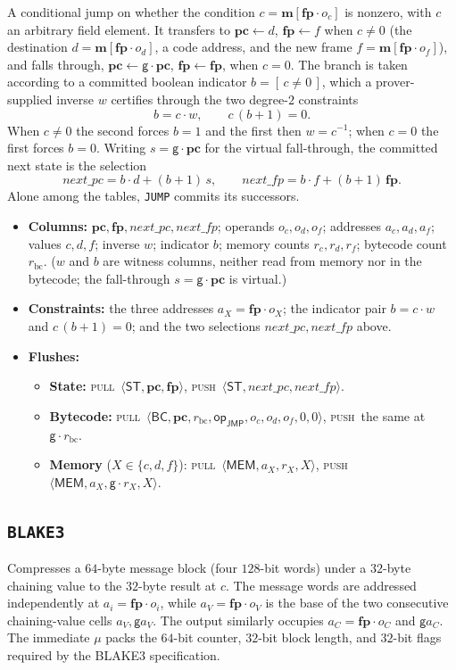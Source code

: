 \documentclass[11pt]{article}
\newcommand{\gen}{\mathsf{g}}
\newcommand{\loc}[1]{\mem[\fp\cdot #1]}
\newcommand{\pc}{\mathbf{pc}}
\newcommand{\fp}{\mathbf{fp}}
\newcommand{\mem}{\mathbf{m}}
\newcommand{\push}{\textsc{push}}
\newcommand{\pull}{\textsc{pull}}
\newcommand{\tup}[1]{\langle #1 \rangle}
\newcommand{\dsep}[1]{\mathsf{#1}}
\newcommand{\opc}[1]{\mathsf{op}_{\mathsf{#1}}}
\begin{document}
A conditional jump on whether the condition $c=\loc{o_c}$ is nonzero, with $c$ an arbitrary field element. It transfers to $\pc\gets d$, $\fp\gets f$ when $c\neq0$ (the destination $d=\loc{o_d}$, a code address, and the new frame $f=\loc{o_f}$), and falls through, $\pc\gets\gen\cdot\pc$, $\fp\gets\fp$, when $c=0$. The branch is taken according to a committed boolean indicator $b=[\,c\neq0\,]$, which a prover-supplied inverse $w$ certifies through the two degree-$2$ constraints
\[
  b=c\cdot w,\qquad c\,(b+1)=0 .
\]
When $c\neq0$ the second forces $b=1$ and the first then $w=c^{-1}$; when $c=0$ the first forces $b=0$. Writing $s=\gen\cdot\pc$ for the virtual fall-through, the committed next state is the selection
\[
  \mathit{next\_pc}=b\cdot d+(b+1)\,s,\qquad \mathit{next\_fp}=b\cdot f+(b+1)\,\fp.
\]
Alone among the tables, \texttt{JUMP} commits its successors.
\begin{itemize}
\item \textbf{Columns:} $\pc,\fp,\mathit{next\_pc},\mathit{next\_fp}$; operands $o_c,o_d,o_f$; addresses $a_c,a_d,a_f$; values $c,d,f$; inverse $w$; indicator $b$; memory counts $r_c,r_d,r_f$; bytecode count $r_{\mathrm{bc}}$. ($w$ and $b$ are witness columns, neither read from memory nor in the bytecode; the fall-through $s=\gen\cdot\pc$ is virtual.)
\item \textbf{Constraints:} the three addresses $a_X=\fp\cdot o_X$; the indicator pair $b=c\cdot w$ and $c\,(b+1)=0$; and the two selections $\mathit{next\_pc},\mathit{next\_fp}$ above.
\item \textbf{Flushes:}
  \begin{itemize}
  \item \textbf{State:} \pull\ $\tup{\dsep{ST},\pc,\fp}$, \push\ $\tup{\dsep{ST},\mathit{next\_pc},\mathit{next\_fp}}$.
  \item \textbf{Bytecode:} \pull\ $\tup{\dsep{BC},\pc,r_{\mathrm{bc}},\opc{JMP},o_c,o_d,o_f,0,0}$, \push\ the same at $\gen\cdot r_{\mathrm{bc}}$.
  \item \textbf{Memory} ($X\in\{c,d,f\}$): \pull\ $\tup{\dsep{MEM},a_X,r_X,X}$, \push\ $\tup{\dsep{MEM},a_X,\gen\cdot r_X,X}$.
  \end{itemize}
\end{itemize}

\subsection{\texttt{BLAKE3}}\label{sec:tab-blake3}

Compresses a $64$-byte message block (four $128$-bit words) under a $32$-byte chaining value to the $32$-byte result at $c$. The message words are addressed independently at $a_i=\fp\cdot o_i$, while $a_V=\fp\cdot o_V$ is the base of the two consecutive chaining-value cells $a_V,\gen a_V$. The output similarly occupies $a_C=\fp\cdot o_C$ and $\gen a_C$. The immediate $\mu$ packs the $64$-bit counter, $32$-bit block length, and $32$-bit flags required by the BLAKE3 specification.
\end{document}
